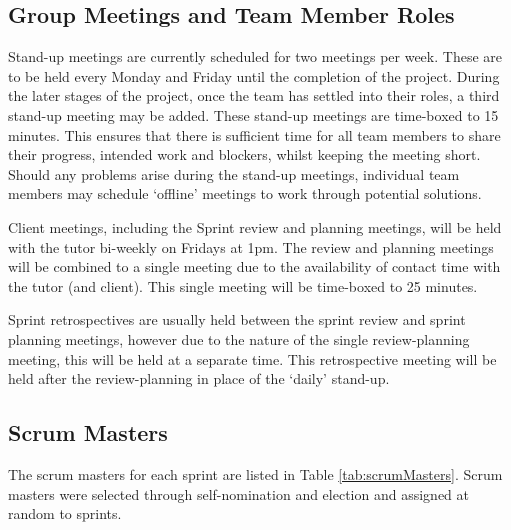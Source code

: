 \begin{spacing}{1.3}

\section{Group Meetings and Team Member Roles}

Stand-up meetings are currently scheduled for two meetings per week. These are to be held every Monday and Friday until the completion of the project. During the later stages of the project, once the team has settled into their roles, a third stand-up meeting may be added. These stand-up meetings are time-boxed to 15 minutes. This ensures that there is sufficient time for all team members to share their progress, intended work and blockers, whilst keeping the meeting short. Should any problems arise during the stand-up meetings, individual team members may schedule `offline' meetings to work through potential solutions. \\
\vspace{-5pt}

Client meetings, including the Sprint review and planning meetings, will be held with the tutor bi-weekly on Fridays at 1pm. The review and planning meetings will be combined to a single meeting due to the availability of contact time with the tutor (and client). This single meeting will be time-boxed to 25 minutes. \\
\vspace{-5pt}

Sprint retrospectives are usually held between the sprint review and sprint planning meetings, however due to the nature of the single review-planning meeting, this will be held at a separate time. 
This retrospective meeting will be held after the review-planning in place of the `daily' stand-up.

\subsection{Scrum Masters}

The scrum masters for each sprint are listed in Table \ref{tab:scrumMasters}.
Scrum masters were selected through self-nomination and election and assigned at random to sprints. 


\end{spacing}
